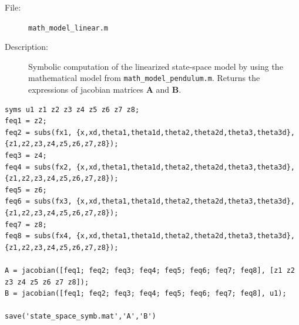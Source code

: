 \documentclass[a4paper,12pt]{article}
\begin{document}
\begin{description}
	\item[File:] \texttt{math\_model\_linear.m}
	\item[Description:] Symbolic computation of the linearized state-space model by using the mathematical model from \texttt{math\_model\_pendulum.m}. Returns the expressions of jacobian matrices $\mathbf{A}$ and $\mathbf{B}$.
\end{description}
\begin{lstlisting}[label=code:mathmodellinear,caption=\texttt{math\_model\_linear.m}]
syms u1 z1 z2 z3 z4 z5 z6 z7 z8;
feq1 = z2;
feq2 = subs(fx1, {x,xd,theta1,theta1d,theta2,theta2d,theta3,theta3d}, {z1,z2,z3,z4,z5,z6,z7,z8});
feq3 = z4;
feq4 = subs(fx2, {x,xd,theta1,theta1d,theta2,theta2d,theta3,theta3d}, {z1,z2,z3,z4,z5,z6,z7,z8});
feq5 = z6;
feq6 = subs(fx3, {x,xd,theta1,theta1d,theta2,theta2d,theta3,theta3d}, {z1,z2,z3,z4,z5,z6,z7,z8});
feq7 = z8;
feq8 = subs(fx4, {x,xd,theta1,theta1d,theta2,theta2d,theta3,theta3d}, {z1,z2,z3,z4,z5,z6,z7,z8});

A = jacobian([feq1; feq2; feq3; feq4; feq5; feq6; feq7; feq8], [z1 z2 z3 z4 z5 z6 z7 z8]);
B = jacobian([feq1; feq2; feq3; feq4; feq5; feq6; feq7; feq8], u1);

save('state_space_symb.mat','A','B')
\end{lstlisting}
\end{document}
